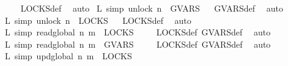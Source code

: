 \begin{isabellebody}
\isadelimproof
\ \ \ %
\endisadelimproof
%
\isatagproof
{}\isamarkupfalse%
\ LOCKS{\isacharunderscore}{\kern0pt}def\ \isamarkupfalse%
\ auto%
\endisatagproof
{\isafoldproof}%
%
\isadelimproof
%
\endisadelimproof
\isanewline
{}\isamarkupfalse%
\ L{}\ {\isacharbrackleft}{\kern0pt}simp{\isacharbrackright}{\kern0pt}{\isacharcolon}{\kern0pt}\ {\isacartoucheopen}unlock\ n\ {\isasymnotin}\ GVARS{\isacartoucheclose}%
\isadelimproof
\ %
\endisadelimproof
%
\isatagproof
{}\isamarkupfalse%
\ GVARS{\isacharunderscore}{\kern0pt}def\ \isamarkupfalse%
\ auto%
\endisatagproof
{\isafoldproof}%
%
\isadelimproof
%
\endisadelimproof
\isanewline
{}\isamarkupfalse%
\ L{}\ {\isacharbrackleft}{\kern0pt}simp{\isacharbrackright}{\kern0pt}{\isacharcolon}{\kern0pt}\ {\isacartoucheopen}unlock\ n\ {\isasymin}\ LOCKS{\isacartoucheclose}%
\isadelimproof
\ %
\endisadelimproof
%
\isatagproof
{}\isamarkupfalse%
\ LOCKS{\isacharunderscore}{\kern0pt}def\ \isamarkupfalse%
\ auto%
\endisatagproof
{\isafoldproof}%
%
\isadelimproof
%
\endisadelimproof
\isanewline
\isanewline
{}\isamarkupfalse%
\ L{}\ {\isacharbrackleft}{\kern0pt}simp{\isacharbrackright}{\kern0pt}{\isacharcolon}{\kern0pt}\ {\isacartoucheopen}read\isactrlsub g\isactrlsub l\isactrlsub o\isactrlsub b\isactrlsub a\isactrlsub l\ n\ m\ {\isasymnotin}\ LOCKS{\isacartoucheclose}%
\isadelimproof
\ \ \ %
\endisadelimproof
%
\isatagproof
{}\isamarkupfalse%
\ LOCKS{\isacharunderscore}{\kern0pt}def\ GVARS{\isacharunderscore}{\kern0pt}def\ \isamarkupfalse%
\ auto%
\endisatagproof
{\isafoldproof}%
%
\isadelimproof
%
\endisadelimproof
\isanewline
{}\isamarkupfalse%
\ L{}\ {\isacharbrackleft}{\kern0pt}simp{\isacharbrackright}{\kern0pt}{\isacharcolon}{\kern0pt}\ {\isacartoucheopen}read\isactrlsub g\isactrlsub l\isactrlsub o\isactrlsub b\isactrlsub a\isactrlsub l\ n\ m\ {\isasymin}\ GVARS{\isacartoucheclose}%
\isadelimproof
\ \ \ %
\endisadelimproof
%
\isatagproof
{}\isamarkupfalse%
\ LOCKS{\isacharunderscore}{\kern0pt}def\ GVARS{\isacharunderscore}{\kern0pt}def\ \isamarkupfalse%
\ auto%
\endisatagproof
{\isafoldproof}%
%
\isadelimproof
%
\endisadelimproof
\isanewline
{}\isamarkupfalse%
\ L{}\ {\isacharbrackleft}{\kern0pt}simp{\isacharbrackright}{\kern0pt}{\isacharcolon}{\kern0pt}\ {\isacartoucheopen}upd\isactrlsub g\isactrlsub l\isactrlsub o\isactrlsub b\isactrlsub a\isactrlsub l\ n\ m\ {\isasymnotin}\ LOCKS{\isacartoucheclose}%

\end{isabellebody}
